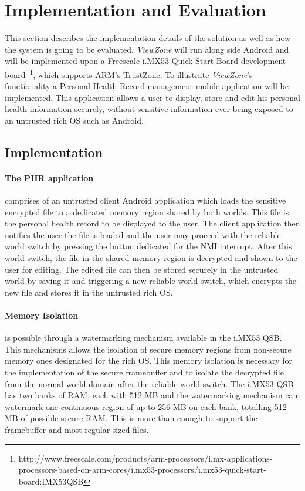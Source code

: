 
% 
% 
\section{Implementation and Evaluation}
\label{sec:evaluation}

This section describes the implementation details of the solution as well as how the system is going to be evaluated. \emph{ViewZone} will run along side Android and will be implemented upon a Freescale i.MX53 Quick Start Board development board~\footnote{http://www.freescale.com/products/arm-processors/i.mx-applications-processors-based-on-arm-cores/i.mx53-processors/i.mx53-quick-start-board:IMX53QSB}, which supports ARM's TrustZone. To illustrate \emph{ViewZone}'s functionality a Personal Health Record management mobile application will be implemented. This application allows a user to display, store and edit his personal health information securely, without sensitive information ever being exposed to an untrusted rich OS such as Android.

\subsection{Implementation}

\paragraph{The \ac{PHR} application} comprises of an untrusted client Android application which loads the sensitive encrypted file to a dedicated memory region shared by both worlds. This file is the personal health record to be displayed to the user. The client application then notifies the user the file is loaded and the user may proceed with the reliable world switch by pressing the button dedicated for the \ac{NMI} interrupt. After this world switch, the file in the shared memory region is decrypted and shown to the user for editing. The edited file can then be stored securely in the untrusted world by saving it and triggering a new reliable world switch, which encrypts the new file and stores it in the untrusted rich OS.

\paragraph{Memory Isolation} is possible through a watermarking mechanism available in the i.MX53 QSB. This mechanisms allows  the isolation of secure memory regions from non-secure memory ones designated for the rich OS. This memory isolation is necessary for the implementation of the secure framebuffer and to isolate the decrypted file from the normal world domain after the reliable world switch. The i.MX53 QSB has two banks of RAM, each with 512 MB and the watermarking mechanism can watermark one continuous region of up to 256 MB on each bank, totalling 512 MB of possible secure RAM. This is more than enough to support the framebuffer and most regular sized files.

